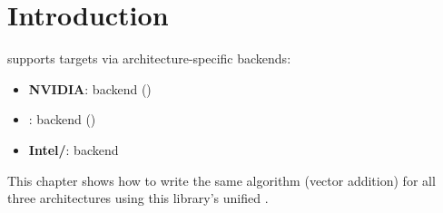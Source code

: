 \section{Introduction}

 supports  targets via architecture-specific backends:
\begin{itemize}[noitemsep]
  \item \textbf{NVIDIA}:  backend ()
  \item \textbf{}:  backend ()
  \item \textbf{Intel/}:  backend
\end{itemize}

This chapter shows how to write the same algorithm (vector addition) for all three  architectures using this library's unified .

